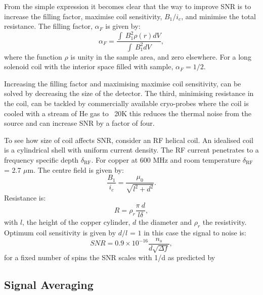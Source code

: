 From the simple expression it becomes clear that the way to improve SNR is to increase the filling factor, maximise coil sensitivity,
$B_1/i_c$, and minimise the total resistance. The filling factor, $\alpha_F$ is given by:
\begin{equation}\label{eqn:FillingFactor}
  \alpha_F = \frac{\int~B_1^2\rho(r)dV}{\int~B_1^2dV},
\end{equation}
where the function $\rho$ is unity in the sample area, and zero elsewhere. For a long solenoid coil with the
interior space filled with sample, $\alpha_F = 1/2$.

Increasing the filling factor and maximising maximise coil sensitivity, can be solved by decreasing the size of
the detector. The third, minimising resistance in the coil,
can be tackled by commercially available cryo-probes where the coil is cooled with a stream of He gas to
~20K this reduces the thermal noise from the source and can increase SNR by a factor of four.

To see how size of coil affects SNR, consider an RF helical coil. An idealised coil
is a cylindrical shell with uniform current density. The RF current penetrates to a frequency
specific depth $\delta_{\text{RF}}$. For copper at 600 MHz and room temperature $\delta_{\text{RF}}$ = 2.7 $\mu$m. The centre
field is given by:
\begin{equation}
  \frac{B_1}{i_c} = \frac{\mu_0}{\sqrt{l^2+d^2}}.
\end{equation}
Resistance is:
\begin{equation}
  R = \rho_r\frac{\pi~d}{l\delta},
\end{equation}
with $l$, the height of the copper cylinder, $d$ the diameter and $\rho_r$ the resistivity.
Optimum coil sensitivity is given by $d/l$ = $1$ in this case the signal to noise is:
\begin{equation}\label{eqn:1/d}
  SNR = 0.9\times10^{-16}\frac{n_s}{d\sqrt{\Delta{f}}},
\end{equation}
for a fixed number of spins the SNR scales with 1/d as predicted by \citep{Hoult:1976dw}

\subsection{Signal Averaging}\label{Signal Averaging}

